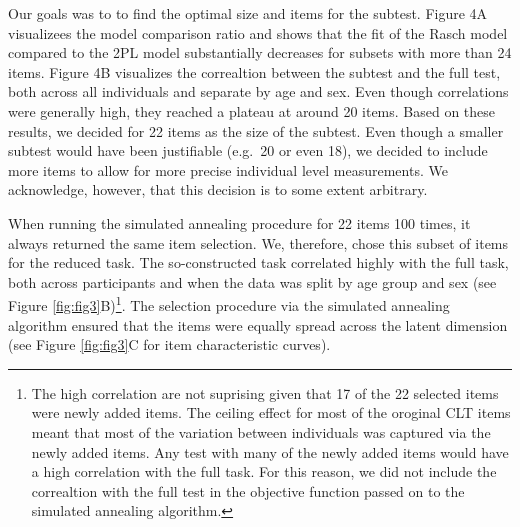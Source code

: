 \documentclass[
  man,floatsintext]{apa6}
\begin{document}
Our goals was to to find the optimal size and items for the subtest. Figure 4A visualizees the model comparison ratio and shows that the fit of the Rasch model compared to the 2PL model substantially decreases for subsets with more than 24 items. Figure 4B visualizes the correaltion between the subtest and the full test, both across all individuals and separate by age and sex. Even though correlations were generally high, they reached a plateau at around 20 items. Based on these results, we decided for 22 items as the size of the subtest. Even though a smaller subtest would have been justifiable (e.g.~20 or even 18), we decided to include more items to allow for more precise individual level measurements. We acknowledge, however, that this decision is to some extent arbitrary.

When running the simulated annealing procedure for 22 items 100 times, it always returned the same item selection. We, therefore, chose this subset of items for the reduced task. The so-constructed task correlated highly with the full task, both across participants and when the data was split by age group and sex (see Figure \ref{fig:fig3}B)\footnote{The high correlation are not suprising given that 17 of the 22 selected items were newly added items. The ceiling effect for most of the oroginal CLT items meant that most of the variation between individuals was captured via the newly added items. Any test with many of the newly added items would have a high correlation with the full task. For this reason, we did not include the correaltion with the full test in the objective function passed on to the simulated annealing algorithm.}. The selection procedure via the simulated annealing algorithm ensured that the items were equally spread across the latent dimension (see Figure \ref{fig:fig3}C for item characteristic curves).
\end{document}
